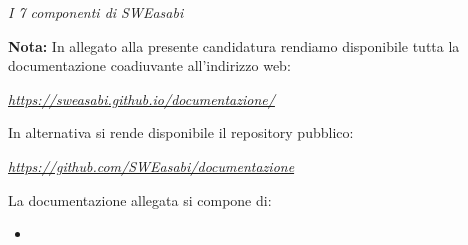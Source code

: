 \documentclass{article}
\begin{document}
\begin{flushright}
\textit{I 7 componenti di SWEasabi}
\end{flushright}

\textbf{Nota:} In allegato alla presente candidatura rendiamo disponibile tutta la documentazione coadiuvante all'indirizzo web:

\begin{center}
    \href{https://sweasabi.github.io/documentazione/}{\textit{https://sweasabi.github.io/documentazione/}}
\end{center}

In alternativa si rende disponibile il repository pubblico:

\begin{center}
    \href{https://github.com/SWEasabi/documentazione}{\textit{https://github.com/SWEasabi/documentazione}}
\end{center}

La documentazione allegata si compone di:
\begin{itemize}
    \item
\end{itemize}
\end{document}
